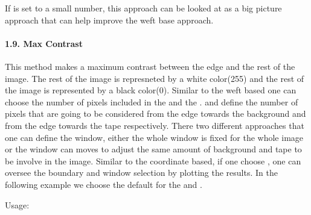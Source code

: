 \documentclass[letterpaper,10pt,english]{sphinxmanual}
\begin{document}
\noindent{}

\noindent{}

\sphinxAtStartPar
If  is set to a small number, this approach can be looked at as a
big picture approach that can help improve the weft base approach.


\paragraph{1.9. Max Contrast}
\label{\detokenize{tutorials:max-contrast}}
\sphinxAtStartPar
This method makes a maximum contrast between the edge and the rest of the image.
The rest of the image is represneted by a white color(255) and the rest of the
image is represented by a black color(0). Similar to the weft based one can choose
the number of pixels included in the  and the .
 and  define the number of pixels
that are going to be considered from the edge towards the background and from the
edge towards the tape respectively. There two different approaches that one can
define the window, either the whole window is fixed for the whole image or the window
can moves to adjust the same amount of background and tape to be involve in the image.
Similar to the coordinate based, if one choose , one can oversee the
boundary and window selection by plotting the results. In the following example
we choose the default for the  and .

\sphinxAtStartPar
Usage:

\begin{sphinxVerbatim}[commandchars=\\\{\}]
\end{sphinxVerbatim}


\sphinxstepscope
\end{document}
